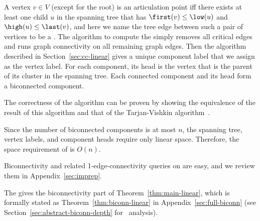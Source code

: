  A vertex $v\in V$ (except for the root) is an articulation point iff there exists at least one child $u$ in the spanning tree that has $\first(v)\le\low(u)$ and $\high(u)\le\last(v)$, and here we name the tree edge between such a pair of vertices to be a .  The algorithm to compute the \imprep{} simply removes all critical edges and runs graph connectivity on all remaining graph edges.
Then the algorithm described in Section~\ref{sec:cc-linear} gives a unique component label that we assign as the vertex label.
For each component, its head is the vertex that is the parent of its cluster in the spanning tree.
Each connected component and its head form a biconnected component.

The correctness of the algorithm can be proven by showing the
equivalence of the result of this algorithm and that of the
Tarjan-Vishkin algorithm~\cite{tarjan1985efficient}.

Since the number of biconnected components is at most $n$, the spanning
tree, vertex labels, and component heads require only linear space. Therefore,
 the space requirement of \imprep{} is $O(n)$.

\medskip
Biconnectivity and related 1-edge-connectivity queries on \imprep{} are easy, and we review them in Appendix~\ref{sec:imprep}.

\medskip
The \imprep{} gives the biconnectivity part of Theorem~\ref{thm:main-linear}, which is formally stated as Theorem~\ref{thm:biconn-linear} in Appendix~\ref{sec:full-biconn} (see Section~\ref{sec:abstract-biconn-depth} for \depth\ analysis).



